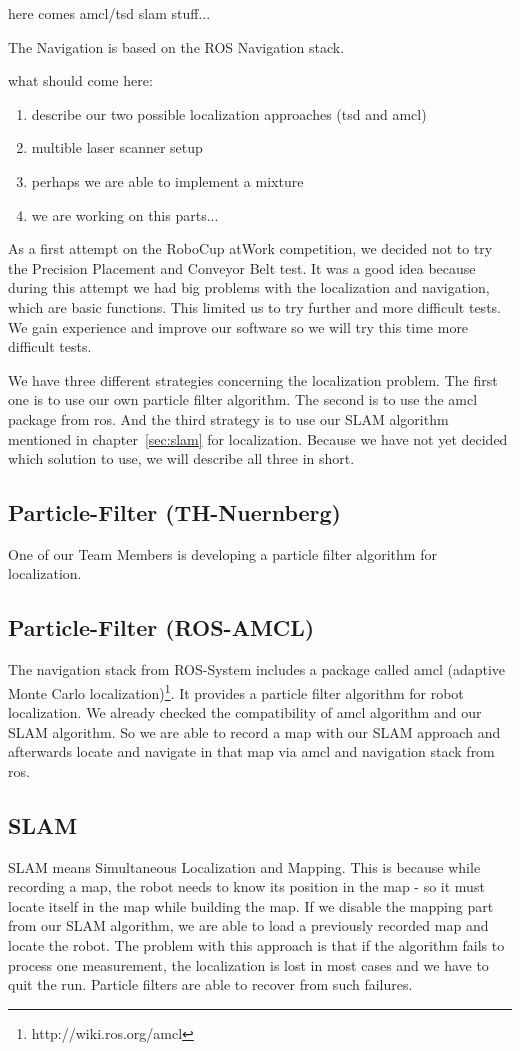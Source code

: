 here comes amcl/tsd slam stuff...

The Navigation is based on the ROS Navigation stack.

what should come here:
\begin{enumerate}
	\item describe our two possible localization approaches (tsd and amcl)
	\item multible laser scanner setup
	\item perhaps we are able to implement a mixture
	\item we are working on this parts...
\end{enumerate}

As a first attempt on the RoboCup atWork  competition, we decided not to try the Precision Placement and Conveyor Belt test. It was a good idea because during this attempt we had big problems with the localization and navigation, which are basic functions. This limited us to try further and more difficult tests. We gain experience and improve our software so we will try this time more difficult tests.

We have three different strategies concerning the localization problem. The first one is to use our own particle filter algorithm. The second is to use the amcl package from ros. And the third strategy is to use our SLAM algorithm mentioned in chapter~\ref{sec:slam} for localization. Because we have not yet decided which solution to use, we will describe all three in short.

\subsection{Particle-Filter (TH-Nuernberg)}
One of our Team Members is developing a particle filter algorithm for localization. 

\subsection{Particle-Filter (ROS-AMCL)}
The navigation stack from ROS-System includes a package called amcl (adaptive Monte Carlo localization)\footnote{http://wiki.ros.org/amcl}. It provides a particle filter algorithm for robot localization. We already checked the compatibility of amcl algorithm and our SLAM algorithm. So we are able to record a map with our SLAM approach and afterwards locate and navigate in that map via amcl and navigation stack from ros.

\subsection{SLAM}
SLAM means Simultaneous Localization and Mapping. This is because while recording a map, the robot needs to know its position in the map - so it must locate itself in the map while building the map. If we disable the mapping part from our SLAM algorithm, we are able to load a previously recorded map and locate the robot. The problem with this approach is that if the algorithm fails to process one measurement, the localization is lost in most cases and we have to quit the run. Particle filters are able to recover from such failures.

